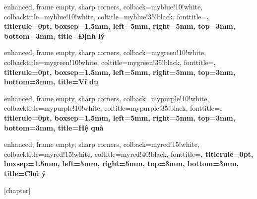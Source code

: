   {
    enhanced, frame empty, sharp corners,
    colback=myblue!10!white, colbacktitle=myblue!10!white,
    coltitle=myblue!35!black, fonttitle=\sffamily\bfseries,
    titlerule=0pt,
    boxsep=1.5mm, left=5mm, right=5mm, top=3mm, bottom=3mm,
    title={\hspace{0.5em}Định lý~\thetcbcounter{}}
  }
  {}

  {
    enhanced, frame empty, sharp corners,
    colback=mygreen!10!white, colbacktitle=mygreen!10!white,
    coltitle=mygreen!35!black, fonttitle=\sffamily\bfseries,
    titlerule=0pt,
    boxsep=1.5mm, left=5mm, right=5mm, top=3mm, bottom=3mm,
    title={\hspace{0.5em}Ví dụ~\thetcbcounter{}}
  }
  {}

  {
    enhanced, frame empty, sharp corners,
    colback=mypurple!10!white, colbacktitle=mypurple!10!white,
    coltitle=mypurple!35!black, fonttitle=\sffamily\bfseries,
    titlerule=0pt,
    boxsep=1.5mm, left=5mm, right=5mm, top=3mm, bottom=3mm,
    title={\hspace{0.5em}Hệ quả~\thetcbcounter{}}
  }
  {}

  {
    enhanced, frame empty, sharp corners,
    colback=myred!15!white, colbacktitle=myred!15!white,
    coltitle=myred!40!black, fonttitle=\sffamily\bfseries,
    titlerule=0pt,
    boxsep=1.5mm, left=5mm, right=5mm, top=3mm, bottom=3mm,
    title={\hspace{0.5em}Chú ý~\thetcbcounter{}}
  }
  {}



[chapter]
\renewcommand{\thecauhoicounter}{\thechapter.\arabic{cauhoicounter}}

